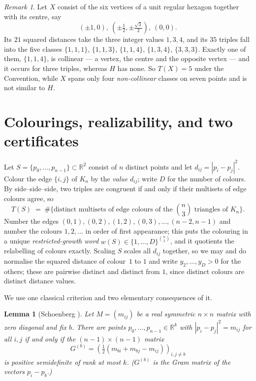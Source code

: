 \documentclass[11pt]{amsart}
\numberwithin{theorem}{section}
\newtheorem{lemma}[theorem]{Lemma}
\theoremstyle{remark}
\newtheorem{remark}[theorem]{Remark}
\theoremstyle{definition}
\newcommand{\Tcount}{T}
\begin{document}
\begin{remark}\label{rem:hexcentre}
Let $X$ consist of the six vertices of a unit regular hexagon together with its
centre, say
\[
  (\pm 1,0),\ \left(\pm\tfrac12,\pm\tfrac{\sqrt3}2\right),\ (0,0).
\]
Its $21$ squared distances take the three integer values $1,3,4$, and its $35$
triples fall into the five classes
$\{1,1,1\}$, $\{1,1,3\}$, $\{1,1,4\}$, $\{1,3,4\}$, $\{3,3,3\}$. Exactly one of
them, $\{1,1,4\}$, is collinear --- a vertex, the centre and the opposite vertex
--- and it occurs for three triples, whereas $H$ has none. So $\Tcount(X)=5$
under the Convention, while $X$ spans only four \emph{non-collinear} classes on
seven points and is not similar to $H$.
\end{remark}

\section{Colourings, realizability, and two certificates}\label{sec:certs}

Let $S=\{p_0,\dots,p_{n-1}\}\subset\mathbb R^2$ consist of $n$ distinct points
and let $d_{ij}=|p_i-p_j|^2$. Colour the edge $\{i,j\}$ of $K_n$ by the
\emph{value} $d_{ij}$; write $D$ for the number of colours. By
side--side--side, two triples are congruent if and only if their multisets of
edge colours agree, so
\begin{equation}\label{eq:Tequals}
  \Tcount(S) \;=\; \#\{\text{distinct multisets of edge colours of the
  $\binom n3$ triangles of } K_n\}.
\end{equation}
Number the edges $(0,1),(0,2),(1,2),(0,3),\dots,(n-2,n-1)$ and number the
colours $1,2,\dots$ in order of first appearance; this puts the colouring in a
unique \emph{restricted-growth word} $w(S)\in\{1,\dots,D\}^{\binom n2}$, and it
quotients the relabelling of colours exactly. Scaling $S$ scales all $d_{ij}$
together, so we may and do normalise the squared distance of colour~$1$ to $1$
and write $y_2,\dots,y_D>0$ for the others; these are pairwise distinct and
distinct from $1$, since distinct colours are distinct distance values.

We use one classical criterion and two elementary consequences of it.

\begin{lemma}[Schoenberg \cite{Schoenberg}]\label{lem:schoenberg}
Let $M=(m_{ij})$ be a real symmetric $n\times n$ matrix with zero diagonal and
fix $b$. There are points $p_0,\dots,p_{n-1}\in\mathbb R^k$ with
$|p_i-p_j|^2=m_{ij}$ for all $i,j$ if and only if the $(n-1)\times(n-1)$ matrix
\[
  G^{(b)} = \left(\tfrac12\left(m_{bi}+m_{bj}-m_{ij}\right)\right)_{i,j\ne b}
\]
is positive semidefinite of rank at most $k$. \textup{(}$G^{(b)}$ is the Gram
matrix of the vectors $p_i-p_b$.\textup{)}
\end{lemma}
\end{document}
